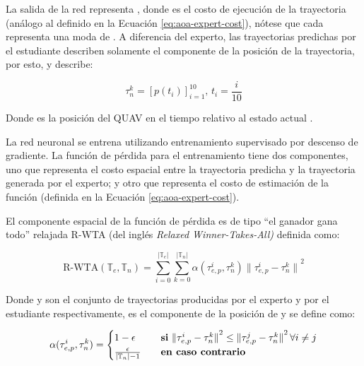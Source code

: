 La salida de la red representa , donde  es el costo de ejecución de la trayectoria  (análogo al definido en la Ecuación \ref{eq:aoa-expert-cost}), nótese que cada  representa una moda de . A diferencia del experto, las trayectorias predichas por el estudiante describen solamente el componente de la posición de la trayectoria, por esto,  y describe:

\begin{equation}
\label{eq:aoa-network-taun}
    \tau_{n}^{k} = {[p(t_i)]}_{i = 1}^{10}, \, t_i = \frac{i}{10}
\end{equation}

Donde  es la posición del QUAV en el tiempo  relativo al estado actual .

La red neuronal se entrena utilizando entrenamiento supervisado por descenso de gradiente. La función de pérdida para el entrenamiento tiene dos componentes, uno que representa el costo espacial entre la trayectoria predicha y la trayectoria generada por el experto; y otro que representa el costo de estimación de la función  (definida en la Ecuación \ref{eq:aoa-expert-cost}).

El componente espacial de la función de pérdida es de tipo ``el ganador gana todo'' relajada R-WTA (del inglés \textit{Relaxed Winner-Takes-All)} definida como:

\begin{equation}
\label{eq:aoa-student-spacial-loss}
    \text{R-WTA}(\mathbb{T}_e, \mathbb{T}_n) = \sum_{i=0}^{|\mathbb{T}_e|} \sum_{k=0}^{|\mathbb{T}_n|} \alpha(\tau_{e,p}^{i}, \tau_{n}^{k}) {\|\tau_{e,p}^{i} - \tau_{n}^{k}\|}^2
\end{equation}

Donde  y  son el conjunto de trayectorias producidas por el experto y por el estudiante respectivamente,  es el componente de la posición de  y  se define como:

\begin{equation}
\label{eq:aoa-student-spacial-alpha}
    \alpha(\tau_{e,p}^{i}, \tau_{n}^{k}) = \begin{cases}
        1 - \epsilon                            & \quad\text{\textbf{si} } {\|\tau_{e,p}^{i} - \tau_{n}^{k}\|}^2 \leq {\|\tau_{e,p}^{j} - \tau_{n}^{k}\|}^2 \, \forall i \ne j \\
        \frac{\epsilon}{|\mathbb{T}_n| - 1}     & \quad\text{\textbf{en caso contrario}}
    \end{cases}
\end{equation}

